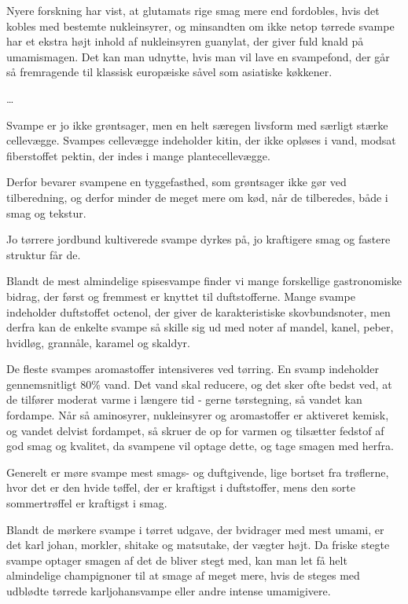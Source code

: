 \documentclass[
]{book}
\begin{document}
Nyere forskning har vist, at glutamats rige smag mere end fordobles, hvis det
kobles med bestemte nukleinsyrer, og minsandten om ikke netop tørrede svampe
har et ekstra højt inhold af nukleinsyren guanylat, der giver fuld knald på
umamismagen. Det kan man udnytte, hvis man vil lave en svampefond, der går så
fremragende til klassisk europæiske såvel som asiatiske køkkener.

\ldots{}

Svampe er jo ikke grøntsager, men en helt særegen livsform med særligt stærke
cellevægge. Svampes cellevægge indeholder kitin, der ikke opløses i vand, modsat
fiberstoffet pektin, der indes i mange plantecellevægge.

Derfor bevarer svampene en tyggefasthed, som grøntsager ikke gør ved tilberedning,
og derfor minder de meget mere om kød, når de tilberedes, både i smag og tekstur.

Jo tørrere jordbund kultiverede svampe dyrkes på, jo kraftigere smag og fastere
struktur får de.

Blandt de mest almindelige spisesvampe finder vi mange forskellige gastronomiske
bidrag, der først og fremmest er knyttet til duftstofferne. Mange svampe indeholder
duftstoffet octenol, der giver de karakteristiske skovbundsnoter, men derfra
kan de enkelte svampe så skille sig ud med noter af mandel, kanel, peber,
hvidløg, grannåle, karamel og skaldyr.

De fleste svampes aromastoffer intensiveres ved tørring. En svamp indeholder
gennemsnitligt 80\% vand. Det vand skal reducere, og det sker ofte bedst ved, at de
tilfører moderat varme i længere tid - gerne tørstegning, så vandet kan
fordampe. Når så aminosyrer, nukleinsyrer og aromastoffer er aktiveret kemisk,
og vandet delvist fordampet, så skruer de op for varmen og tilsætter fedstof
af god smag og kvalitet, da svampene vil optage dette, og tage smagen med herfra.

Generelt er møre svampe mest smags- og duftgivende, lige bortset fra trøflerne,
hvor det er den hvide tøffel, der er kraftigst i duftstoffer, mens den sorte
sommertrøffel er kraftigst i smag.

Blandt de mørkere svampe i tørret udgave, der bvidrager med mest umami, er det
karl johan, morkler, shitake og matsutake, der vægter højt. Da friske stegte
svampe optager smagen af det de bliver stegt med, kan man let få helt almindelige
champignoner til at smage af meget mere, hvis de steges med udblødte tørrede
karljohansvampe eller andre intense umamigivere.
\end{document}
